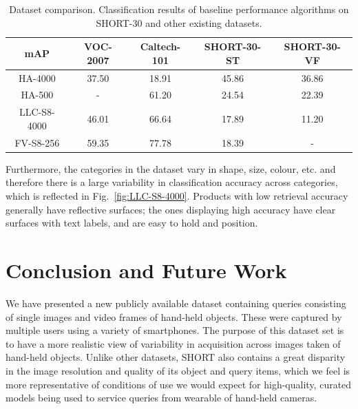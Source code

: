 \begin{table}
\begin{center}
    \begin{tabular}{ccccc}
    \toprule
    mAP & VOC-2007 & Caltech-101 & SHORT-30-ST & SHORT-30-VF \\
	\midrule
    HA-4000                    & 37.50    & 18.91       & 45.86       & 36.86 \\
    HA-500                     & -        & 61.20       & 24.54       & 22.39       \\
    LLC-S8-4000                & 46.01    & 66.64       & 17.89       & 11.20       \\
    FV-S8-256                  & 59.35    & 77.78       & 18.39       & -           \\
	\bottomrule
    \end{tabular}
	\end{center}
    \caption{Dataset comparison. Classification results of baseline performance algorithms on SHORT-30 and other existing datasets.}
    \label{table:dataset_comparison}
\end{table}


Furthermore, the categories in the dataset vary in shape, size, colour, etc. and therefore there is a large variability in classification accuracy across categories, which is reflected in Fig.~\ref{fig:LLC-S8-4000}. Products with low retrieval accuracy generally have reflective surfaces; the ones displaying high accuracy have clear surfaces with text labels, and are easy to hold and position. 


\section{Conclusion and Future Work} \label{sec:conclusions}

We have presented a new publicly available  dataset containing queries consisting of single images and video frames of hand-held objects.  These were captured by multiple users using a variety of smartphones. The purpose of this dataset set is to have a more realistic view of variability in acquisition across images taken of hand-held objects. Unlike other datasets, SHORT also contains a great disparity in the image resolution and quality of its object and query items, which we feel is more representative of conditions of use we would expect for high-quality, curated models being used to service queries from wearable of hand-held cameras.

